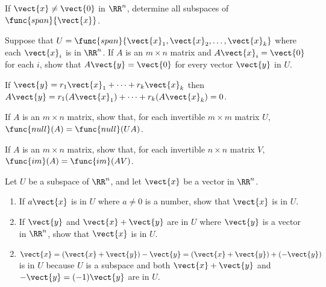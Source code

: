 \begin{multicols}{2}
\begin{ex}
If $\vect{x} \neq \vect{0}$ in $\RR^n$, determine all subspaces of $\func{span}\{\vect{x}\}$.
\end{ex}

\begin{ex}
Suppose that $U = \func{span}\{\vect{x}_{1}, \vect{x}_{2}, \dots, \vect{x}_{k}\}$ where each $\vect{x}_{i}$ is in $\RR ^n$. If $A$ is an $m \times n$ matrix and $A\vect{x}_{i} = \vect{0}$ for each $i$, show that $A\vect{y} = \vect{0}$ for every vector $\vect{y}$ in $U$.

\begin{sol}
If $\vect{y} = r_{1}\vect{x}_{1} + \dots + r_{k}\vect{x}_{k}$ then $A\vect{y} = r_{1}(A\vect{x}_{1}) + \dots + r_{k}(A\vect{x}_{k}) = 0$.
\end{sol}
\end{ex}

\begin{ex}
If $A$ is an $m \times n$ matrix, show that, for each invertible $m \times m$ matrix $U$, $\func{null}(A) = \func{null}(UA)$.
\end{ex}

\begin{ex}
If $A$ is an $m \times n$ matrix, show that, for each invertible $n \times n$ matrix $V$, $\func{im}(A) = \func{im}(AV)$.
\end{ex}

\begin{ex}
Let $U$ be a subspace of $\RR^n$, and let $\vect{x}$ be a vector in $\RR^n$.

\begin{enumerate}[label={\alph*.}]
\item If $a\vect{x}$ is in $U$ where $a \neq 0$ is a number, show that $\vect{x}$ is in $U$.

\item If $\vect{y}$ and $\vect{x} + \vect{y}$ are in $U$ where $\vect{y}$ is a vector in $\RR^n$, show that $\vect{x}$ is in $U$.

\end{enumerate}
\begin{sol}
\begin{enumerate}[label={\alph*.}]
\setcounter{enumi}{1}
\item  $\vect{x} = (\vect{x} + \vect{y}) - \vect{y} = (\vect{x} + \vect{y}) + (-\vect{y})$ is in $U$ because $U$ is a subspace and both $\vect{x} + \vect{y}$ and $-\vect{y} = (-1)\vect{y}$ are in $U$.

\end{enumerate}
\end{sol}
\end{ex}


\end{multicols}
